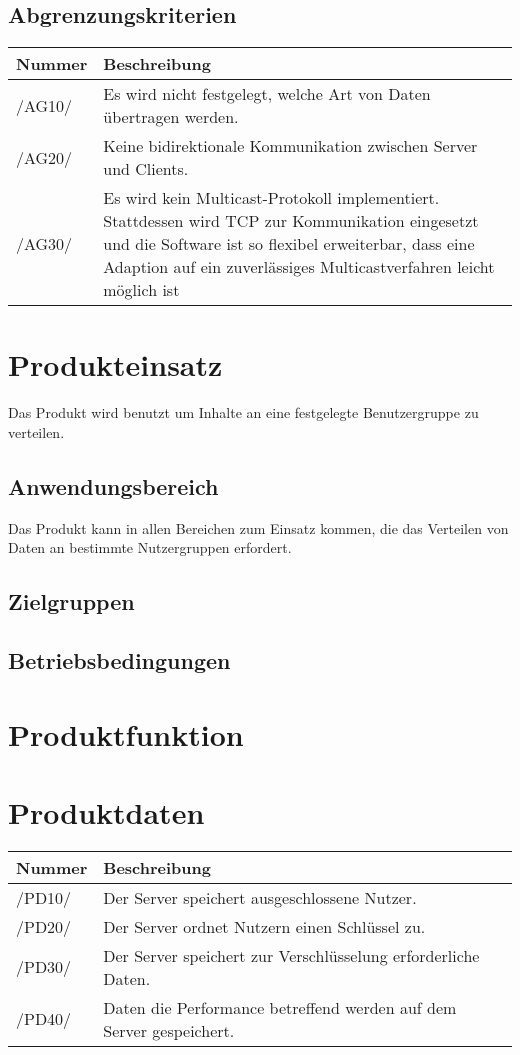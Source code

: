 \documentclass[a4paper,10pt]{article}
\newcommand\addrow[2]{#1 &#2\\ }
\newcommand\addheading[2]{#1 &#2\\ \hline}
\newcommand\tabularhead{\begin{tabular}{lp{13cm}}
\hline
}
\newenvironment{usecase}{\tabularhead}
{\hline\end{tabular}}
\begin{document}
\subsection{Abgrenzungskriterien}
\newcommand{\abgrenzungKuerzel}{AG}
\begin{usecase}
\addheading{Nummer}{Beschreibung}
\addrow{/\abgrenzungKuerzel10/} {Es wird nicht festgelegt, welche Art von Daten
                                 übertragen werden.}
\addrow{/\abgrenzungKuerzel20/} {Keine bidirektionale Kommunikation zwischen Server
                                 und Clients.}
\addrow{/\abgrenzungKuerzel30/} {Es wird kein Multicast-Protokoll implementiert. Stattdessen
                                 wird TCP zur Kommunikation eingesetzt und die Software
                                 ist so flexibel erweiterbar, dass eine Adaption auf
                                 ein zuverlässiges Multicastverfahren leicht möglich ist}
\end{usecase}

\section{Produkteinsatz}
Das Produkt wird benutzt um Inhalte an eine festgelegte Benutzergruppe zu verteilen.
\subsection{Anwendungsbereich}
Das Produkt kann in allen Bereichen zum Einsatz kommen, die das Verteilen von Daten an
bestimmte Nutzergruppen erfordert.
\subsection{Zielgruppen}

\subsection{Betriebsbedingungen}

\section{Produktfunktion}

\section{Produktdaten}
\newcommand{\datenKuerzel}{PD}
\begin{usecase}
\addheading{Nummer}{Beschreibung}
\addrow{/\datenKuerzel10/} {Der Server speichert ausgeschlossene Nutzer.}
\addrow{/\datenKuerzel20/} {Der Server ordnet Nutzern einen Schlüssel zu.}
\addrow{/\datenKuerzel30/} {Der Server speichert zur Verschlüsselung erforderliche Daten.}
\addrow{/\datenKuerzel40/} {Daten die Performance betreffend werden auf dem Server gespeichert.}
\end{usecase}
\end{document}

